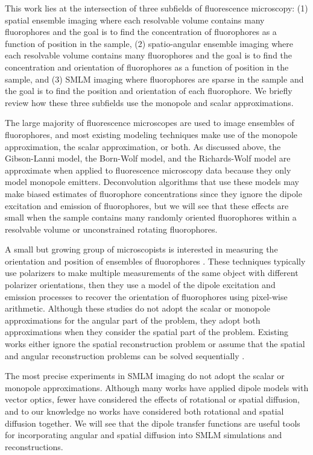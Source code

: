 \documentclass[]{osa-article}
\begin{document}
This work lies at the intersection of three subfields of fluorescence
microscopy: (1) spatial ensemble imaging where each resolvable volume contains
many fluorophores and the goal is to find the concentration of fluorophores as a
function of position in the sample, (2) spatio-angular ensemble imaging where
each resolvable volume contains many fluorophores and the goal is to find the
concentration and orientation of fluorophores as a function of position in the
sample, and (3) SMLM imaging where fluorophores are sparse in the sample and the
goal is to find the position and orientation of each fluorophore. We briefly
review how these three subfields use the monopole and scalar approximations.

The large majority of fluorescence microscopes are used to image ensembles of
fluorophores, and most existing modeling techniques make use of the monopole
approximation, the scalar approximation, or both. As discussed above, the
Gibson-Lanni model, the Born-Wolf model, and the Richards-Wolf model are
approximate when applied to fluorescence microscopy data because they only model
monopole emitters. Deconvolution algorithms that use these models may make
biased estimates of fluorophore concentrations since they ignore the dipole
excitation and emission of fluorophores, but we will see that these effects are
small when the sample contains many randomly oriented fluorophores within a
resolvable volume or unconstrained rotating fluorophores.

A small but growing group of microscopists is interested in measuring the
orientation and position of ensembles of fluorophores \cite{vrabioiu2006,
  mattheyses2010, mehta2016, mcquilken2017, zhanghao2017}. These techniques
typically use polarizers to make multiple measurements of the same object with
different polarizer orientations, then they use a model of the dipole excitation
and emission processes \cite{fourkas2001} to recover the orientation of
fluorophores using pixel-wise arithmetic. Although these studies do not adopt
the scalar or monopole approximations for the angular part of the problem, they
adopt both approximations when they consider the spatial part of the problem.
Existing works either ignore the spatial reconstruction problem
\cite{vrabioiu2006, mattheyses2010, mehta2016, mcquilken2017} or assume that the
spatial and angular reconstruction problems can be solved sequentially
\cite{zhanghao2017}.

The most precise experiments in SMLM imaging do not adopt the scalar or monopole
approximations. Although many works have applied dipole models with vector
optics, fewer have considered the effects of rotational or spatial diffusion,
and to our knowledge no works have considered both rotational and spatial
diffusion together. We will see that the dipole transfer functions are useful
tools for incorporating angular and spatial diffusion into SMLM simulations and
reconstructions.
\end{document}

